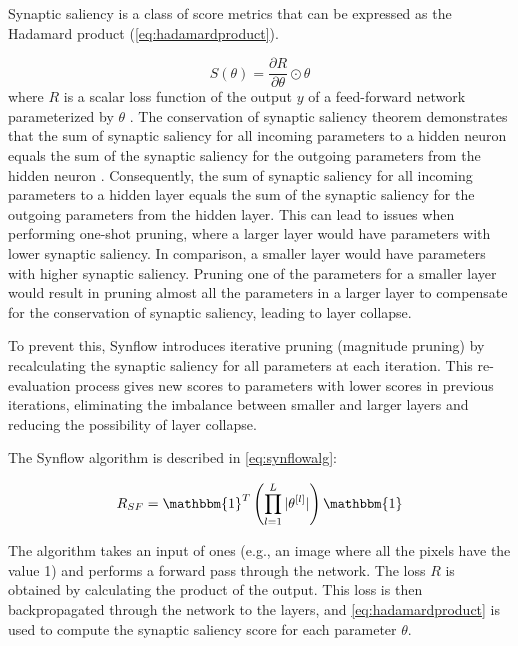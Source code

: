 \noindent Synaptic saliency is a class of score metrics that can be expressed as the Hadamard product (\cref{eq:hadamardproduct}).

\begin{equation}
S(\theta) = \frac{\partial R}{\partial \theta} \odot \theta
\label{eq:hadamardproduct}
\end{equation}
where $R$ is a scalar loss function of the output $y$ of a feed-forward network parameterized by $\theta$ \autocite{tanaka2020pruning}. The conservation of synaptic saliency theorem demonstrates that the sum of synaptic saliency for all incoming parameters to a hidden neuron equals the sum of the synaptic saliency for the outgoing parameters from the hidden neuron \autocite{tanaka2020pruning}. Consequently, the sum of synaptic saliency for all incoming parameters to a hidden layer equals the sum of the synaptic saliency for the outgoing parameters from the hidden layer. This can lead to issues when performing one-shot pruning, where a larger layer would have parameters with lower synaptic saliency. In comparison, a smaller layer would have parameters with higher synaptic saliency. Pruning one of the parameters for a smaller layer would result in pruning almost all the parameters in a larger layer to compensate for the conservation of synaptic saliency, leading to layer collapse.

\noindent To prevent this, \gls{Synflow} introduces iterative pruning (magnitude pruning) by recalculating the synaptic saliency for all parameters at each iteration. This re-evaluation process gives new scores to parameters with lower scores in previous iterations, eliminating the imbalance between smaller and larger layers and reducing the possibility of layer collapse.

\noindent The \gls{Synflow} algorithm is described in \cref{eq:synflowalg}:

\begin{equation}\label{eq:synflowalg}
R_{SF} = \mathbbm{1}^T \left( \prod^L_{l=1} |\theta^{[l]}| \right) \mathbbm{1}
\end{equation}

The algorithm takes an input of ones (e.g., an image where all the pixels have the value 1) and performs a forward pass through the network. The loss $R$ is obtained by calculating the product of the output. This loss is then backpropagated through the network to the layers, and \cref{eq:hadamardproduct} is used to compute the synaptic saliency score for each parameter $\theta$.


